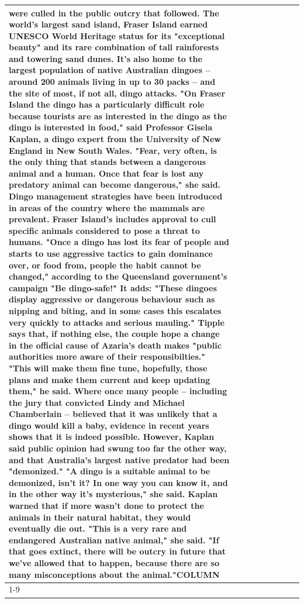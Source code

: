 \begin{table}[H]
\begin{tabular}{lllrlllll}
were culled in the public outcry that followed. The world's largest sand island, Fraser Island earned UNESCO World Heritage status for its "exceptional beauty" and its rare combination of tall rainforests and towering sand dunes. It's also home to the largest population of native Australian dingoes -- around 200 animals living in up to 30 packs -- and the site of most, if not all, dingo attacks. "On Fraser Island the dingo has a particularly difficult role because tourists are as interested in the dingo as the dingo is interested in food," said Professor Gisela Kaplan, a dingo expert from the University of New England in New South Wales. "Fear, very often, is the only thing that stands between a dangerous animal and a human. Once that fear is lost any predatory animal can become dangerous," she said. Dingo management strategies have been introduced in areas of the country where the mammals are prevalent. Fraser Island's includes approval to cull specific animals considered to pose a threat to humans. "Once a dingo has lost its fear of people and starts to use aggressive tactics to gain dominance over, or food from, people the habit cannot be changed," according to the Queensland government's campaign "Be dingo-safe!" It adds: "These dingoes display aggressive or dangerous behaviour such as nipping and biting, and in some cases this escalates very quickly to attacks and serious mauling." Tipple says that, if nothing else, the couple hope a change in the official cause of Azaria's death makes "public authorities more aware of their responsibilties." "This will make them fine tune, hopefully, those plans and make them current and keep updating them," he said. Where once many people -- including the jury that convicted Lindy and Michael Chamberlain -- believed that it was unlikely that a dingo would kill a baby, evidence in recent years shows that it is indeed possible. However, Kaplan said public opinion had swung too far the other way, and that Australia's largest native predator had been "demonized." "A dingo is a suitable animal to be demonized, isn't it? In one way you can know it, and in the other way it's mysterious," she said. Kaplan warned that if more wasn't done to protect the animals in their natural habitat, they would eventually die out. "This is a very rare and endangered Australian native animal," she said. "If that goes extinct, there will be outcry in future that we've allowed that to happen, because there are so many misconceptions about the animal."COLUMN \\
\cline{1-9}

\end{tabular}
\end{table}
